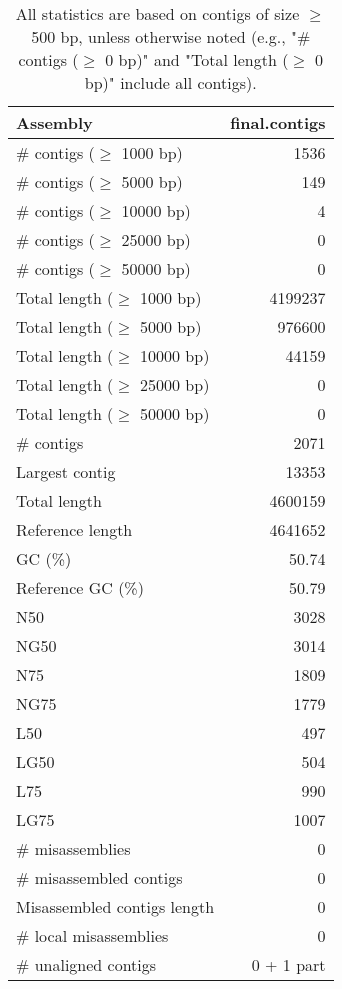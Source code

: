 \documentclass[12pt,a4paper]{article}
\begin{document}
\begin{table}[ht]
\begin{center}
\caption{All statistics are based on contigs of size $\geq$ 500 bp, unless otherwise noted (e.g., "\# contigs ($\geq$ 0 bp)" and "Total length ($\geq$ 0 bp)" include all contigs).}
\begin{tabular}{|l*{1}{|r}|}
\hline
Assembly & final.contigs \\ \hline
\# contigs ($\geq$ 1000 bp) & 1536 \\ \hline
\# contigs ($\geq$ 5000 bp) & 149 \\ \hline
\# contigs ($\geq$ 10000 bp) & 4 \\ \hline
\# contigs ($\geq$ 25000 bp) & 0 \\ \hline
\# contigs ($\geq$ 50000 bp) & 0 \\ \hline
Total length ($\geq$ 1000 bp) & 4199237 \\ \hline
Total length ($\geq$ 5000 bp) & 976600 \\ \hline
Total length ($\geq$ 10000 bp) & 44159 \\ \hline
Total length ($\geq$ 25000 bp) & 0 \\ \hline
Total length ($\geq$ 50000 bp) & 0 \\ \hline
\# contigs & 2071 \\ \hline
Largest contig & 13353 \\ \hline
Total length & 4600159 \\ \hline
Reference length & 4641652 \\ \hline
GC (\%) & 50.74 \\ \hline
Reference GC (\%) & 50.79 \\ \hline
N50 & 3028 \\ \hline
NG50 & 3014 \\ \hline
N75 & 1809 \\ \hline
NG75 & 1779 \\ \hline
L50 & 497 \\ \hline
LG50 & 504 \\ \hline
L75 & 990 \\ \hline
LG75 & 1007 \\ \hline
\# misassemblies & 0 \\ \hline
\# misassembled contigs & 0 \\ \hline
Misassembled contigs length & 0 \\ \hline
\# local misassemblies & 0 \\ \hline
\# unaligned contigs & 0 + 1 part \\ \hline

\end{tabular}
\end{center}
\end{table}
\end{document}
